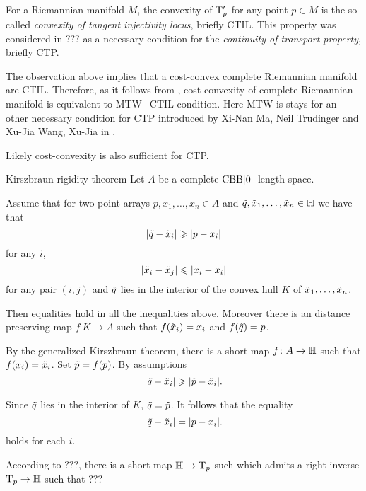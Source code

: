 For a Riemannian manifold $M$,
the convexity of $\T'_p$ for any point $p\in M$ is the so called \emph{convexity of tangent injectivity locus}, briefly CTIL.
This property was considered in ??? as a necessary condition for the \emph{continuity of transport property}, briefly CTP.

The observation above implies that a cost-convex complete Riemannian manifold are CTIL.
Therefore, as it follows from \cite{loeper}, cost-convexity of complete Riemannian manifold is equivalent to MTW+CTIL condition.
Here MTW is stays for an other necessary condition for CTP introduced by Xi-Nan Ma, Neil Trudinger and Xu-Jia Wang, Xu-Jia in \cite{MTW}.

Likely cost-convexity is also sufficient for CTP.


\begin{thm}{Kirszbraun rigidity theorem}\label{thm:kirszbraun-rigid}
Let $A$ be a complete $\CBB[0]$ length space.

Assume that for two point arrays $p,x_1,\dots,x_n\in A$ and $\~q, \~x_1,\dots,\~x_n\in \HH$ we have that 
\[|\~q-\~x_i|\ge |p-x_i|\]
for any $i$,
\[|\~x_i-\~x_j|\le |x_i-x_i|\]
for any pair $(i,j)$
and $\~q$ lies in the interior of the convex hull $K$ of $\~x_1,\dots,\~x_n$.

Then equalities hold in all the inequalities above.
Moreover there is an distance preserving map $f\:K\to A$ such that $f(\~x_i)=x_i$ and $f(\~q)=p$. 
\end{thm}

By the generalized Kirszbraun theorem, there is a short map $f\:A\to \HH$
such that $f(x_i)=\~x_i$.
Set  $\~p=f(p)$.
By assumptions
\[|\~q-\~x_i|\ge |\~p-\~x_i|.\]

Since $\~q$ lies in the interior of $K$, $\~q=\~p$.
It follows that the equality 
\[|\~q-\~x_i|= |p-x_i|.\]
holds for each $i$.

According to ???, there is a short map $\HH\to \T_p$ such which admits a right inverse $\T_p\to \HH$ such that ???
\qeds
